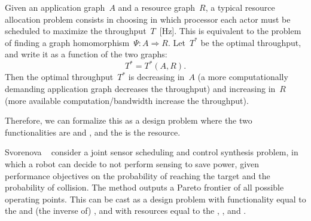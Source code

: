 Given an application graph~$A$ and a resource graph~$R$, a typical
resource allocation problem consists in choosing in which processor
each actor must be scheduled to maximize the throughput~$T$~[Hz].
This is equivalent to the problem of finding a graph homomorphism~$\Psi \colon A \Rightarrow R$.
Let~$T^{\ast}$ be the optimal throughput, and write it as a function
of the two graphs:
\begin{equation*}
    T^{\ast}=T^{\ast}(A,R).
\end{equation*}
Then the optimal throughput~$T^{\ast}$ is decreasing in~$A$ (a more
computationally demanding application graph decreases the throughput)
and increasing in~$R$ (more available computation/bandwidth increase
the throughput).

Therefore, we can formalize this as a design problem where the two
functionalities are  and , and the  is the
resource.

\begin{figure}[h!]
    \begin{center}
    \end{center}
    \caption{}
\end{figure}


\begin{example}
    Svorenova\,\,\etal~\cite{svorenova16resource} consider a joint
    sensor scheduling and control synthesis problem, in which a robot
    can decide to not perform sensing to save power, given performance
    objectives on the probability of reaching the target and the probability
    of collision. The method outputs a Pareto frontier of all possible
    operating points. This can be cast as a design problem with functionality
    equal to the  and (the inverse
    of) , and with resources equal to the
    , , and .

\end{example}

\begin{figure}[h]
    \begin{center}
    \end{center}
    \caption{\label{fig:progressive-1-1}}
\end{figure}



